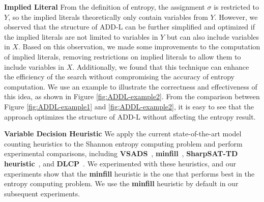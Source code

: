 \textbf{Implied Literal}
From the definition of entropy, the assignment $\sigma$ is restricted to $Y$, so the implied literals theoretically only contain variables from $Y$.
However, we observed that the structure of ADD-L can be further simplified and optimized if the implied literals are not limited to variables in $Y$ but can also include variables in $X$.
Based on this observation, we made some improvements to the computation of implied literals, removing restrictions on implied literals to allow them to include variables in $X$. Additionally, we found that this technique can enhance the efficiency of the search without compromising the accuracy of entropy computation.
We use an example to illustrate the correctness and effectiveness of this idea, as shown in Figure \ref{fig:ADDL-example2}.
From the comparison between Figure \ref{fig:ADDL-example1} and \ref{fig:ADDL-example2}, it is easy to see that the approach optimizes the structure of ADD-L without affecting the entropy result.

\textbf{Variable Decision Heuristic} 
We apply the current state-of-the-art model counting heuristics to the Shannon entropy computing problem and perform experimental comparisons, including \textbf{VSADS}~\cite{sang2005heuristics}, \textbf{minfill}~\cite{darwiche2009modeling}, \textbf{SharpSAT-TD heuristic}~\cite{korhonen2021integrating}, and \textbf{DLCP}~\cite{lai2021power}.
We experimented with these heuristics, and our experiments show that the \textbf{minfill} heuristic is the one that performs best in the entropy computing problem. 
We use the \textbf{minfill} heuristic by default in our subsequent experiments.


